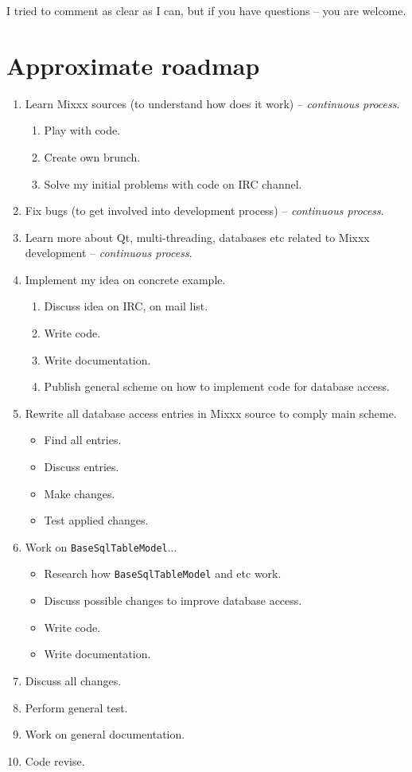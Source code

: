 \documentclass[a4paper,12pt]{scrartcl}
\begin{document}
I tried to comment as clear as I can, but if you have questions -- you are welcome.


\section{Approximate roadmap}
\begin{enumerate}
 \item Learn Mixxx sources (to understand how does it work) -- \textit{continuous process}.
 \begin{enumerate}
  \item Play with code.
  \item Create own brunch.
  \item Solve my initial problems with code on IRC channel.
 \end{enumerate}
 \item Fix bugs (to get involved into development process) -- \textit{continuous process}.
 \item Learn more about Qt, multi-threading, databases etc related to Mixxx development -- \textit{continuous process}.
 \item Implement my idea on concrete example.
 \begin{enumerate}
  \item Discuss idea on IRC, on mail list.
  \item Write code.
  \item Write documentation.
  \item Publish general scheme on how to implement code for database access.
 \end{enumerate}
 \item Rewrite all database access entries in Mixxx source to comply main scheme.
 \begin{itemize}
  \item Find all entries.
  \item Discuss entries.
  \item Make changes.
  \item Test applied changes.
 \end{itemize}
 \item Work on \texttt{BaseSqlTableModel}...
 \begin{itemize}
  \item Research how \texttt{BaseSqlTableModel} and etc work.
  \item Discuss possible changes to improve database access.
  \item Write code.
  \item Write documentation.
 \end{itemize}

 \item Discuss all changes.
 \item Perform general test.
 \item Work on general documentation.
 \item Code revise.
\end{enumerate}
\end{document}
